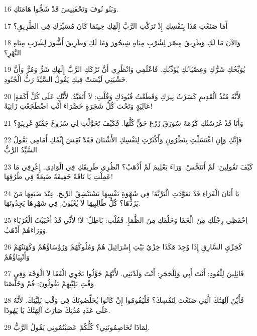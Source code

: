 \par 16 وَبَنُو نُوفَ وَتَحْفَنِيسَ قَدْ شَجُّوا هَامَتَكِ.
\par 17 أَمَا صَنَعْتِ هَذَا بِنَفْسِكِ إِذْ تَرَكْتِ الرَّبَّ إِلَهَكِ حِينَمَا كَانَ مُسَيِّرَكِ فِي الطَّرِيقِ؟
\par 18 وَالآنَ مَا لَكِ وَطَرِيقَ مِصْرَ لِشُرْبِ مِيَاهِ شِيحُورَ وَمَا لَكِ وَطَرِيقَ أَشُّورَ لِشُرْبِ مِيَاهِ النَّهْرِ؟
\par 19 يُوَبِّخُكِ شَرُّكِ وَعِصْيَانُكِ يُؤَدِّبُكِ. فَاعْلَمِي وَانْظُرِي أَنَّ تَرْكَكِ الرَّبَّ إِلَهَكِ شَرٌّ وَمُرٌّ وَأَنَّ خَشْيَتِي لَيْسَتْ فِيكِ يَقُولُ السَّيِّدُ رَبُّ الْجُنُودِ.
\par 20 [لأَنَّهُ مُنْذُ الْقَدِيمِ كَسَرْتُ نِيرَكِ وَقَطَعْتُ قُيُودَكِ وَقُلْتِ: لاَ أَتَعَبَّدُ. لأَنَّكِ عَلَى كُلِّ أَكَمَةٍ عَالِيَةٍ وَتَحْتَ كُلِّ شَجَرَةٍ خَضْرَاءَ أَنْتِ اضْطَجَعْتِ زَانِيَةً!
\par 21 وَأَنَا قَدْ غَرَسْتُكِ كَرْمَةَ سُورَقَ زَرْعَ حَقٍّ كُلَّهَا. فَكَيْفَ تَحَوَّلْتِ لِي سُرُوغَ جَفْنَةٍ غَرِيبَةٍ؟
\par 22 فَإِنَّكِ وَإِنِ اغْتَسَلْتِ بِنَطْرُونٍ وَأَكْثَرْتِ لِنَفْسِكِ الأَشْنَانَ فَقَدْ نُقِشَ إِثْمُكِ أَمَامِي يَقُولُ السَّيِّدُ الرَّبُّ
\par 23 كَيْفَ تَقُولِينَ: لَمْ أَتَنَجَّسْ. وَرَاءَ بَعْلِيمَ لَمْ أَذْهَبْ؟ انْظُرِي طَرِيقَكِ فِي الْوَادِي. إِعْرِفِي مَا عَمِلْتِ يَا نَاقَةً خَفِيفَةً ضَبِعَةً فِي طُرُقِهَا!
\par 24 يَا أَتَانَ الْفَرَاءِ قَدْ تَعَوَّدَتِ الْبَرِّيَّةَ! فِي شَهْوَةِ نَفْسِهَا تَسْتَنْشِقُ الرِّيحَ. عِنْدَ ضَبَعِهَا مَنْ يَرُدُّهَا؟ كُلُّ طَالِبِيهَا لاَ يُعْيُونَ. فِي شَهْرِهَا يَجِدُونَهَا.
\par 25 اِحْفَظِي رِجْلَكِ مِنَ الْحَفَا وَحَلْقَكِ مِنَ الظَّمَإِ. فَقُلْتِ: بَاطِلٌ! لاَ! لأَنِّي قَدْ أَحْبَبْتُ الْغُرَبَاءَ وَوَرَاءَهُمْ أَذْهَبُ.
\par 26 كَخِزْيِ السَّارِقِ إِذَا وُجِدَ هَكَذَا خِزْيُ بَيْتِ إِسْرَائِيلَ هُمْ وَمُلُوكُهُمْ وَرُؤَسَاؤُهُمْ وَكَهَنَتُهُمْ وَأَنْبِيَاؤُهُمْ
\par 27 قَائِلِينَ لِلْعُودِ: أَنْتَ أَبِي وَلِلْحَجَرِ: أَنْتَ وَلَدْتَنِي. لأَنَّهُمْ حَوَّلُوا نَحْوِي الْقَفَا لاَ الْوَجْهَ وَفِي وَقْتِ بَلِيَّتِهِمْ يَقُولُونَ: قُمْ وَخَلِّصْنَا.
\par 28 فَأَيْنَ آلِهَتُكَ الَّتِي صَنَعْتَ لِنَفْسِكَ؟ فَلْيَقُومُوا إِنْ كَانُوا يُخَلِّصُونَكَ فِي وَقْتِ بَلِيَّتِكَ. لأَنَّهُ عَلَى عَدَدِ مُدُنِكَ صَارَتْ آلِهَتُكَ يَا يَهُوذَا.
\par 29 لِمَاذَا تُخَاصِمُونَنِي؟ كُلُّكُمْ عَصَيْتُمُونِي يَقُولُ الرَّبُّ.

